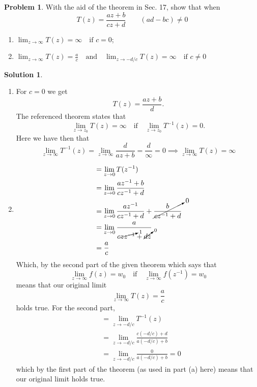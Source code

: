 \documentclass[10pt]{article}
\theoremstyle{definition}
\newtheorem{problem}{Problem}
\newtheorem{soln}{Solution}
\begin{document}
\begin{problem}
With the aid of the theorem in Sec. 17, show that when
$$T(z)=\frac{az+b}{cz+d}\qquad (ad-bc)\neq0$$
\begin{enumerate}[label=(\alph*)]
  \item $\lim_{z\to\infty}T(z)=\infty\quad \text{if } c=0$;
  \item $\lim_{z\to\infty}T(z)=\frac{a}{c}\quad\text{and}\quad\lim_{z\to-d/c}T(z)=\infty\quad\text{if } c\neq 0$
\end{enumerate}
\end{problem}
\begin{soln}~
  \begin{enumerate}[label=(\alph*)]
    \item For $c=0$ we get
          $$T(z)=\frac{az+b}{d}.$$
          The referenced theorem states that
          $$\lim_{z\to z_0}T(z)=\infty\quad\text{if}\quad \lim_{z\to z_0}T^{-1}(z)=0.$$
          Here we have then that
          $$\lim_{z\to \infty}T^{-1}(z)=\lim_{z\to \infty}\frac{d}{az+b}=\frac{d}{\infty}=0\implies \lim_{z\to\infty}T(z)=\infty$$
    \item \begin{align*}
             & =\lim_{z\to 0}T(z^{-1})                                                   \\
             & =\lim_{z\to 0}\frac{az^{-1}+b}{cz^{-1}+d}                                 \\
             & =\lim_{z\to 0}\frac{az^{-1}}{cz^{-1}+d}+\cancelto{0}{\frac{b}{cz^{-1}+d}} \\
             & =\lim_{z\to 0}\frac{a}{c\cancelto{1}{zz^{-1}}+\cancelto{0}{dz}}           \\
             & =\frac{a}{c}
          \end{align*}
          Which, by the second part of the given theorem which says that
          $$\lim_{z\to\infty}f(z)=w_0\quad\text{if}\quad\lim_{z\to\infty}f(z^{-1})=w_0$$
          means that our original limit
          $$\lim_{z\to\infty}T(z)=\frac{a}{c}$$
          holds true. For the second part,
          \begin{align*}
             & =\lim_{z\to-d/c}T^{-1}(z)                   \\
             & =\lim_{z\to-d/c}\frac{c(-d/c)+d}{a(-d/c)+b} \\
             & =\lim_{z\to-d/c}\frac{0}{a(-d/c)+b}=0
          \end{align*}
          which by the first part of the theorem (as used in part (a) here) means that our original limit holds true.
  \end{enumerate}
\end{soln}
\end{document}
